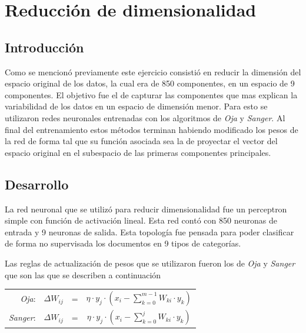 \section{Reducción de dimensionalidad}

\subsection{Introducción}
Como se mencionó previamente este ejercicio consistió en reducir la dimensión
del espacio original de los datos, la cual era de 850 componentes, en un
espacio de 9 componentes. El objetivo fue el de capturar las componentes que
mas explican la variabilidad de los datos en un espacio de dimensión menor.
Para esto se utilizaron redes neuronales entrenadas con los algoritmos de
\textit{Oja} y \textit{Sanger}. Al final del entrenamiento estos métodos
terminan habiendo modificado los pesos de la red de forma tal que su función
asociada sea la de proyectar el vector del espacio original en el subespacio de
las primeras componentes principales.

\subsection{Desarrollo}
La red neuronal que se utilizó para reducir dimensionalidad fue un perceptron
simple con función de activación lineal. Esta red contó con 850 neuronas de
entrada y 9 neuronas de salida. Esta topología fue pensada para poder
clasificar de forma no supervisada los documentos en 9 tipos de categorías.

Las reglas de actualización de pesos que se utilizaron fueron los de \textit{Oja} y
 \textit{Sanger} que son las que se describen a continuación

\begin{center}
	\begin{tabular}{rccc}
		\emph{Oja}: & $\Delta W_{ij}$ & = & $\eta \cdot y_{j} \cdot (x_{i} - \displaystyle\sum_{k = 0}^{m-1} W_{ki} \cdot y_{k} )$ \\
		\emph{Sanger}: & $\Delta W_{ij}$ & = & $\eta \cdot y_{j} \cdot (x_{i} - \displaystyle\sum_{k = 0}^{j} W_{ki} \cdot y_{k} )$ \\
	\end{tabular}
\end{center}


